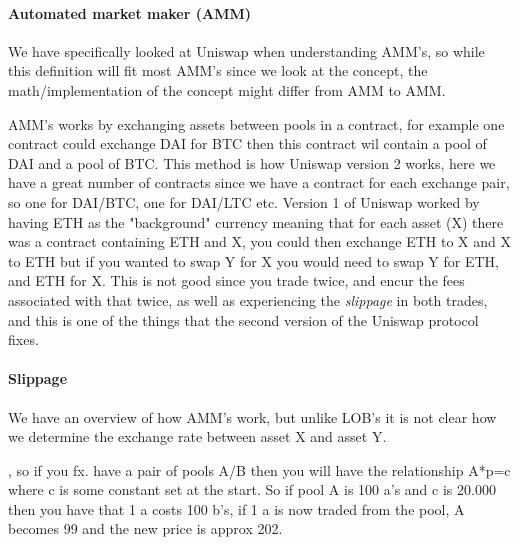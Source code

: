 \paragraph{Automated market maker (AMM)}
We have specifically looked at Uniswap when understanding AMM's, so while this definition will fit most AMM's since we look at the concept, the math/implementation of the concept might differ from AMM to AMM.

AMM's works by exchanging assets between pools in a contract, for example one contract could exchange DAI for BTC then this contract wil contain a pool of DAI and a pool of BTC. This method is how Uniswap version 2 works, here we have a great number of contracts since we have a contract for each exchange pair, so one for DAI/BTC, one for DAI/LTC etc. Version 1 of Uniswap worked by having ETH as the "background" currency meaning that for each asset (X) there was a contract containing ETH and X, you could then exchange ETH to X and X to ETH but if you wanted to swap Y for X you would need to swap Y for ETH, and ETH for X. This is not good since you trade twice, and encur the fees associated with that twice, as well as experiencing the \textit{slippage} in both trades, and this is one of the things that the second version of the Uniswap protocol fixes.

\paragraph{Slippage} We have an overview of how AMM's work, but unlike LOB's it is not clear how we determine the exchange rate between asset X and asset Y.


, so if you fx. have a pair of pools A/B then you will have the relationship A*p=c where c is some constant set at the start. So if pool A is 100 a’s and c is 20.000 then you have that 1 a costs 100 b’s, if 1 a is now traded from the pool, A becomes 99 and the new price is approx 202.